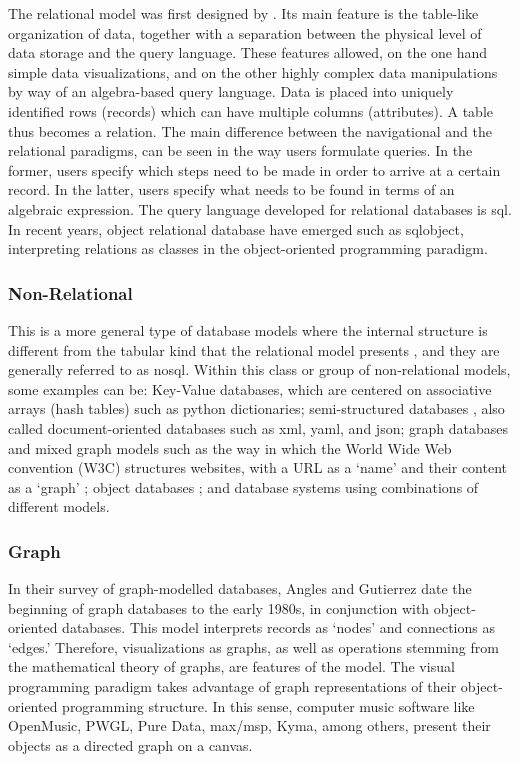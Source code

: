 The relational model was first designed by \textcites{Codd:1970:RMD:362384.362685}{Codd72relationalcompleteness}. Its main feature is the table-like organization of data, together with a separation between the physical level of data storage and the query language. These features allowed, on the one hand simple data visualizations, and on the other highly complex data manipulations by way of an algebra-based query language. Data is placed into uniquely identified rows (records) which can have multiple columns (attributes). A table thus becomes a relation. The main difference between the navigational and the relational paradigms, can be seen in the way users formulate queries. In the former, users specify which steps need to be made in order to arrive at a certain record. In the latter, users specify what needs to be found in terms of an algebraic expression. The query language developed for relational databases is \gls{sql}. In recent years, object relational database have emerged such as \gls{sqlobject}, interpreting relations as classes in the object-oriented programming paradigm.

\subsubsection{Non-Relational}
\label{model:nonrelational}

This is a more general type of database models where the internal structure is different from the tabular kind that the relational model presents , and they are generally referred to as \gls{nosql}. Within this class or group of non-relational models, some examples can be: Key-Value databases, which are centered on associative arrays (hash tables) such as python dictionaries; semi-structured databases , also called document-oriented databases such as \gls{xml}, \gls{yaml}, and \gls{json}; graph databases and mixed graph models such as the way in which the World Wide Web convention (W3C) structures websites, with a URL as a `name' and their content as a `graph' ; object databases ; and database systems using combinations of different models.

\subsubsection{Graph}
\label{model:graph}

In their survey of graph-modelled databases, Angles and Gutierrez \parencite{2008:graph/anglesgutierrez/survey} date the beginning of graph databases to the early 1980s, in conjunction with object-oriented databases. This model interprets records as `nodes' and connections as `edges.' Therefore, visualizations as graphs, as well as operations stemming from the mathematical theory of graphs, are features of the model. The visual programming paradigm takes advantage of graph representations of their object-oriented programming structure. In this sense, computer music software like OpenMusic, PWGL, Pure Data, \gls{max/msp}, Kyma, among others, present their objects as a directed graph on a canvas.

